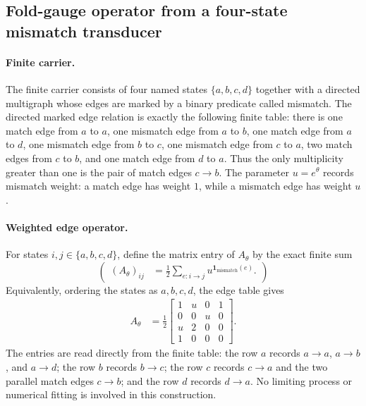 \subsection{Fold-gauge operator from a four-state mismatch transducer}
\label{sec:window6-a0-origin-berstel-transducer-needs-external}

\paragraph{Finite carrier.}
The finite carrier consists of four named states
$\{a,b,c,d\}$ together with a directed multigraph whose edges are marked by a binary predicate called mismatch.  The directed marked edge relation is exactly the following finite table: there is one match edge from $a$ to $a$, one mismatch edge from $a$ to $b$, one match edge from $a$ to $d$, one mismatch edge from $b$ to $c$, one mismatch edge from $c$ to $a$, two match edges from $c$ to $b$, and one match edge from $d$ to $a$.  Thus the only multiplicity greater than one is the pair of match edges $c\to b$.  The parameter $u=e^\theta$ records mismatch weight: a match edge has weight $1$, while a mismatch edge has weight $u$.

\paragraph{Weighted edge operator.}
For states $i,j\in\{a,b,c,d\}$, define the matrix entry of $A_\theta$ by the exact finite sum
$$(
\begin{aligned}
(A_\theta)_{ij}
&=\frac{1}{2}\sum_{e:i\to j} u^{\mathbf{1}_{\mathrm{mismatch}}(e)} .
\end{aligned}
)$$
Equivalently, ordering the states as $a,b,c,d$, the edge table gives
$$
\begin{aligned}
A_\theta
&=\frac{1}{2}
\left[
\begin{array}{cccc}
1 & u & 0 & 1\\
0 & 0 & u & 0\\
u & 2 & 0 & 0\\
1 & 0 & 0 & 0
\end{array}
\right].
\end{aligned}
$$
The entries are read directly from the finite table: the row $a$ records $a\to a$, $a\to b$, and $a\to d$; the row $b$ records $b\to c$; the row $c$ records $c\to a$ and the two parallel match edges $c\to b$; and the row $d$ records $d\to a$.  No limiting process or numerical fitting is involved in this construction.

